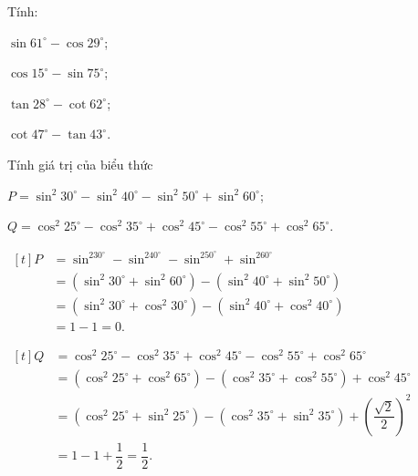 \begin{vd}
	Tính:
	\begin{listEX}[4]
	\item $\sin 61^{\circ}-\cos 29^{\circ}$;
	\item $\cos 15^{\circ}-\sin 75^{\circ}$;
	\item $\tan 28^{\circ}-\cot 62^{\circ}$;
	\item $\cot 47^{\circ}-\tan 43^{\circ}$.
	\end{listEX}
\end{vd}
\begin{vd}%
	Tính giá trị của biểu thức
	\begin{listEX}
	\item $P =\sin^2 30^{\circ} - \sin^2 40^{\circ} - \sin^2 50^{\circ} + \sin^2 60^{\circ}$;
	\item $Q =\cos^2 25^{\circ} - \cos^2 35^{\circ} + \cos^2 45^{\circ} - \cos^2 55^{\circ} + \cos^2 65^{\circ}$.
	\end{listEX}
	\loigiai
	{
	\begin{listEX}
	\item \allowdisplaybreaks $\begin{aligned}[t]
	P &=\sin^230^{\circ} - \sin^240^{\circ} - \sin^250^{\circ} + \sin^260^{\circ}\\
	&= \left(\sin^2 30^{\circ} + \sin^2 60^{\circ}\right) - \left(\sin^2 40^{\circ} + \sin^2 50^{\circ}\right)\\
	&= \left(\sin^2 30^{\circ} + \cos^2 30^{\circ}\right) - \left(\sin^2 40^{\circ} + \cos^2 40^{\circ}\right)\\
	&= 1 - 1 = 0.
	\end{aligned}$
	\item \allowdisplaybreaks $\begin{aligned}[t]
	Q &=\cos^2 25^{\circ} - \cos^2 35^{\circ} + \cos^2 45^{\circ} - \cos^2 55^{\circ} + \cos^2 65^{\circ}\\
	&=\left(\cos^2 25^\circ + \cos^2 65^{\circ}\right) - \left(\cos^2 35^{\circ} + \cos^2 55^{\circ}\right) + \cos^2 45^{\circ}\\
	&= \left(\cos^2 25^{\circ} + \sin^2 25^{\circ}\right) - \left(\cos^2 35^{\circ} + \sin^2 35^{\circ}\right) + \left(\dfrac{\sqrt{2}}{2}\right)^2\\
	&=1 - 1 + \dfrac{1}{2}=\dfrac{1}{2}.
	\end{aligned}$
	\end{listEX}
	}
\end{vd}
